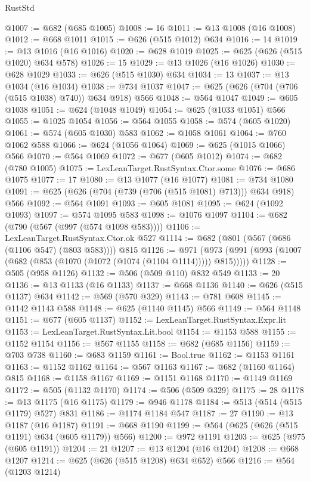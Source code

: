 \begin{lexlean}{RustStd}
\begin{coremodule}
@1007 := @682 (@685 @1005)
@1008 := 16
@1011 := @13 @1008 (@16 @1008)
@1012 := @668 @1011
@1015 := @626 (@515 @1012) @634
@1016 := 14
@1019 := @13 @1016 (@16 @1016)
@1020 := @628 @1019
@1025 := @625 (@626 (@515 @1020) @634 @578)
@1026 := 15
@1029 := @13 @1026 (@16 @1026)
@1030 := @628 @1029
@1033 := @626 (@515 @1030) @634
@1034 := 13
@1037 := @13 @1034 (@16 @1034)
@1038 := @734 @1037
@1047 := @625 (@626 (@704 (@706 (@515 @1038) @740)) @634 @918) @566
@1048 := @564 @1047
@1049 := @605 @1038
@1051 := @624 (@1048 @1049)
@1054 := @625 (@1033 @1051) @566
@1055 := @1025 @1054
@1056 := @564 @1055
@1058 := @574 (@605 @1020)
@1061 := @574 (@605 @1030) @583
@1062 := @1058 @1061
@1064 := @760 @1062 @588
@1066 := @624 (@1056 @1064)
@1069 := @625 (@1015 @1066) @566
@1070 := @564 @1069
@1072 := @677 (@605 @1012)
@1074 := @682 (@780 @1005)
@1075 := LexLeanTarget.RustSyntax.Ctor.some
@1076 := @686 @1075
@1077 := 17
@1080 := @13 @1077 (@16 @1077)
@1081 := @734 @1080
@1091 := @625 (@626 (@704 (@739 (@706 (@515 @1081) @713))) @634 @918) @566
@1092 := @564 @1091
@1093 := @605 @1081
@1095 := @624 (@1092 @1093)
@1097 := @574 @1095 @583
@1098 := @1076 @1097
@1104 := @682 (@790 (@567 (@997 (@574 @1098 @583))))
@1106 := LexLeanTarget.RustSyntax.Ctor.ok @527
@1114 := @682 (@801 (@567 (@686 (@1106 @547) (@803 @583)))) @815
@1126 := @971 (@973 (@991 (@993 (@1007 (@682 (@853 (@1070 (@1072 (@1074 (@1104 @1114))))) @815)))))
@1128 := @505 (@958 @1126)
@1132 := @506 (@509 @110) @832 @549
@1133 := 20
@1136 := @13 @1133 (@16 @1133)
@1137 := @668 @1136
@1140 := @626 (@515 @1137) @634
@1142 := @569 (@570 @329)
@1143 := @781 @608
@1145 := @1142 @1143 @588
@1148 := @625 (@1140 @1145) @566
@1149 := @564 @1148
@1151 := @677 (@605 @1137)
@1152 := LexLeanTarget.RustSyntax.Expr.lit
@1153 := LexLeanTarget.RustSyntax.Lit.bool
@1154 := @1153 @588
@1155 := @1152 @1154
@1156 := @567 @1155
@1158 := @682 (@685 @1156)
@1159 := @703 @738
@1160 := @683 @1159
@1161 := Bool.true
@1162 := @1153 @1161
@1163 := @1152 @1162
@1164 := @567 @1163
@1167 := @682 (@1160 @1164) @815
@1168 := @1158 @1167
@1169 := @1151 @1168
@1170 := @1149 @1169
@1172 := @505 (@1132 @1170)
@1174 := @506 (@509 @329)
@1175 := 28
@1178 := @13 @1175 (@16 @1175)
@1179 := @946 @1178
@1184 := @513 (@514 (@515 @1179) @527) @831
@1186 := @1174 @1184 @547
@1187 := 27
@1190 := @13 @1187 (@16 @1187)
@1191 := @668 @1190
@1199 := @564 (@625 (@626 (@515 @1191) @634 (@605 @1179)) @566)
@1200 := @972 @1191
@1203 := @625 (@975 (@605 @1191))
@1204 := 21
@1207 := @13 @1204 (@16 @1204)
@1208 := @668 @1207
@1214 := @625 (@626 (@515 @1208) @634 @652) @566
@1216 := @564 (@1203 @1214)

\end{coremodule}
\end{lexlean}
